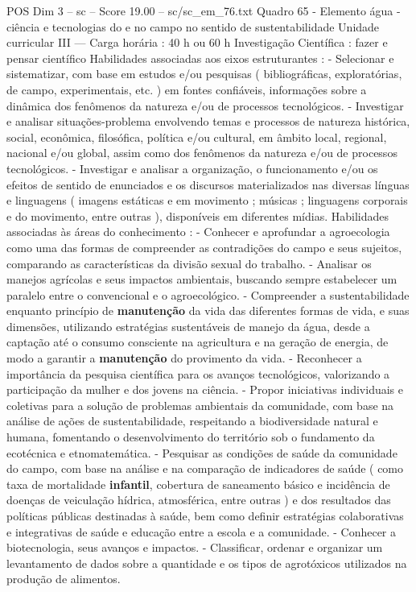 \begin{textsample}{POS Dim 3 – sc – Score 19.00 – sc/sc\_em\_76.txt}
Quadro 65 - Elemento água - ciência e tecnologias do e no campo no sentido de sustentabilidade Unidade curricular III — Carga horária : 40 h ou 60 h Investigação Científica : fazer e pensar científico Habilidades associadas aos eixos estruturantes : - Selecionar e sistematizar, com base em estudos e/ou pesquisas ( bibliográficas, exploratórias, de campo, experimentais, etc. ) em fontes confiáveis, informações sobre a dinâmica dos fenômenos da natureza e/ou de processos tecnológicos. - Investigar e analisar situações-problema envolvendo temas e processos de natureza histórica, social, econômica, filosófica, política e/ou cultural, em âmbito local, regional, nacional e/ou global, assim como dos fenômenos da natureza e/ou de processos tecnológicos. - Investigar e analisar a organização, o funcionamento e/ou os efeitos de sentido de enunciados e os discursos materializados nas diversas línguas e linguagens ( imagens estáticas e em movimento ; músicas ; linguagens corporais e do movimento, entre outras ), disponíveis em diferentes mídias.
Habilidades associadas às áreas do conhecimento : - Conhecer e aprofundar a agroecologia como uma das formas de compreender as contradições do campo e seus sujeitos, comparando as características da divisão sexual do trabalho. - Analisar os manejos agrícolas e seus impactos ambientais, buscando sempre estabelecer um paralelo entre o convencional e o agroecológico. - Compreender a sustentabilidade enquanto princípio de \textbf{manutenção} da vida das diferentes formas de vida, e suas dimensões, utilizando estratégias sustentáveis de manejo da água, desde a captação até o consumo consciente na agricultura e na geração de energia, de modo a garantir a \textbf{manutenção} do provimento da vida. - Reconhecer a importância da pesquisa científica para os avanços tecnológicos, valorizando a participação da mulher e dos jovens na ciência. - Propor iniciativas individuais e coletivas para a solução de problemas ambientais da comunidade, com base na análise de ações de sustentabilidade, respeitando a biodiversidade natural e humana, fomentando o desenvolvimento do território sob o fundamento da ecotécnica e etnomatemática. - Pesquisar as condições de saúde da comunidade do campo, com base na análise e na comparação de indicadores de saúde ( como taxa de mortalidade \textbf{infantil}, cobertura de saneamento básico e incidência de doenças de veiculação hídrica, atmosférica, entre outras ) e dos resultados das políticas públicas destinadas à saúde, bem como definir estratégias colaborativas e integrativas de saúde e educação entre a escola e a comunidade. - Conhecer a biotecnologia, seus avanços e impactos. - Classificar, ordenar e organizar um levantamento de dados sobre a quantidade e os tipos de agrotóxicos utilizados na produção de alimentos.

\end{textsample}
